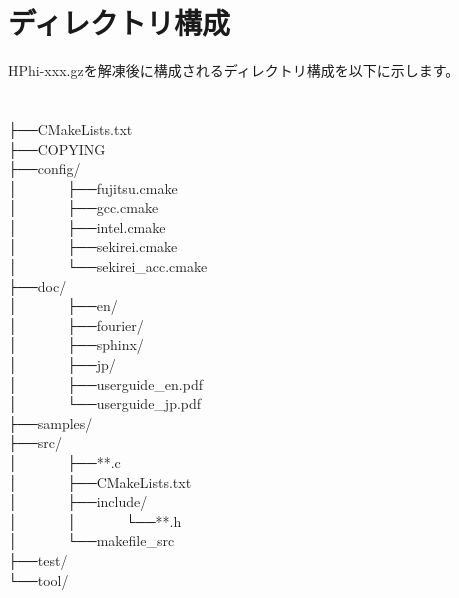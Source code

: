 %
%
%
%

\label{Sec:HowToInstall}
\section{ディレクトリ構成}
HPhi-xxx.gzを解凍後に構成されるディレクトリ構成を以下に示します。\\
\\
\\
├──CMakeLists.txt\\
├──COPYING\\
├──config/\\
│~~~~~~~├──fujitsu.cmake\\
│~~~~~~~├──gcc.cmake\\
│~~~~~~~├──intel.cmake\\
│~~~~~~~├──sekirei.cmake\\
│~~~~~~~└──sekirei\_acc.cmake\\
├──doc/\\
│~~~~~~~├──en/\\
│~~~~~~~├──fourier/\\
│~~~~~~~├──sphinx/\\
│~~~~~~~├──jp/\\
│~~~~~~~├──userguide\_en.pdf\\
│~~~~~~~└──userguide\_jp.pdf\\
├──samples/\\
├──src/\\
│~~~~~~~├──**.c\\
│~~~~~~~├──CMakeLists.txt\\
│~~~~~~~├──include/\\
│~~~~~~~│~~~~~~~└──**.h\\
│~~~~~~~└──makefile\_src\\
├──test/\\
└──tool/\\

